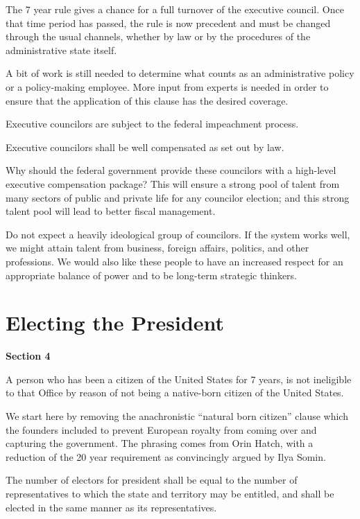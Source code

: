 \documentclass{article}
\begin{document}
The 7 year rule gives a chance for a full turnover of the executive council. Once that time period has passed, the rule is now precedent and must be changed through the usual channels, whether by law or by the procedures of the administrative state itself.

A bit of work is still needed to determine what counts as an administrative policy or a policy-making employee. More input from experts is needed in order to ensure that the application of this clause has the desired coverage.

\begin{quoting}
Executive councilors are subject to the federal impeachment process.

Executive councilors shall be well compensated as set out by law.
\end{quoting}

Why should the federal government provide these councilors with a high-level executive compensation package? This will ensure a strong pool of talent from many sectors of public and private life for any councilor election; and this strong talent pool will lead to better fiscal management.

Do not expect a heavily ideological group of councilors. If the system works well, we might attain talent from business, foreign affairs, politics, and other professions. We would also like these people to have an increased respect for an appropriate balance of power and to be long-term strategic thinkers.

\section{Electing the President}

\begin{quoting}
\textbf{Section 4}

A person who has been a citizen of the United States for 7 years, is not ineligible to that Office by reason of not being a native-born citizen of the United States.
\end{quoting}

We start here by removing the anachronistic “natural born citizen” clause which the founders included to prevent European royalty from coming over and capturing the government. The phrasing comes from Orin Hatch\cite{Somin_Hatch}, with a reduction of the 20 year requirement as convincingly argued by Ilya Somin\cite{Somin_NBC}.

\begin{quoting}
The number of electors for president shall be equal to the number of representatives to which the state and territory may be entitled, and shall be elected in the same manner as its representatives.
\end{quoting}
\end{document}
